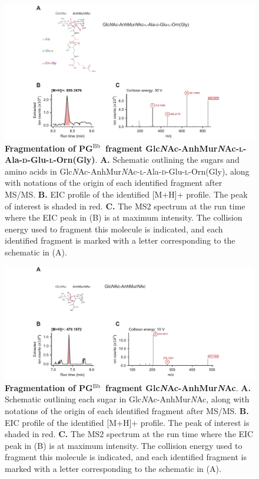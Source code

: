 \documentclass[twoside, watermark]{zHenriquesLab-StyleBioRxiv}
\newcommand{\pgbb}{PG$^\text{Bb}$}
\newcommand{\Z}{Glc\textit{N}Ac-AnhMur\textit{N}Ac}
\newcommand{\ZAEOG}{Glc\textit{N}Ac-AnhMur\textit{N}Ac-\textsc{l}-Ala-\textsc{d}-Glu-\textsc{l}-Orn(Gly)}
\begin{document}
\pagebreak
\begin{figure}[ht!]
    \centering
    \includegraphics[width = \textwidth]{Figures/Figure_S4_ZAEOG_MSMS.pdf}
    \caption{\textbf{Fragmentation of \pgbb~fragment \ZAEOG}. \textbf{A.} Schematic outlining the sugars and amino acids in \ZAEOG, along with notations of the origin of each identified fragment after MS/MS. \textbf{B.} EIC profile of the identified [M+H]+ profile. The peak of interest is shaded in red. \textbf{C.} The MS2 spectrum at the run time where the EIC peak in (B) is at maximum intensity. The collision energy used to fragment this molecule is indicated, and each identified fragment is marked with a letter corresponding to the schematic in (A).}
    \label{fig: figS4}
\end{figure}

\pagebreak
\begin{figure}[ht!]
    \centering
    \includegraphics[width = \textwidth]{Figures/Figure_S5_Z_MSMS.pdf}
    \caption{\textbf{Fragmentation of \pgbb~fragment \Z}. \textbf{A.} Schematic outlining each sugar in \Z, along with notations of the origin of each identified fragment after MS/MS. \textbf{B.} EIC profile of the identified [M+H]+ profile. The peak of interest is shaded in red. \textbf{C.} The MS2 spectrum at the run time where the EIC peak in (B) is at maximum intensity. The collision energy used to fragment this molecule is indicated, and each identified fragment is marked with a letter corresponding to the schematic in (A).}
    \label{fig: figS5}
\end{figure}
\end{document}
